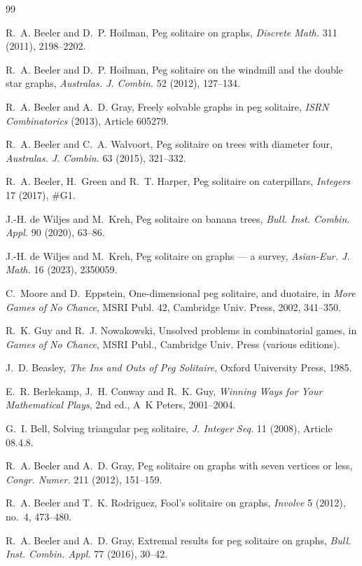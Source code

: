 \documentclass[11pt]{article}
\theoremstyle{definition}
\begin{document}
\begin{thebibliography}{99}

 R.~A. Beeler and D.~P. Hoilman, Peg solitaire on
graphs, \emph{Discrete Math.} 311 (2011), 2198--2202.

 R.~A. Beeler and D.~P. Hoilman, Peg solitaire on the
windmill and the double star graphs, \emph{Australas. J. Combin.} 52
(2012), 127--134.

 R.~A. Beeler and A.~D. Gray, Freely solvable graphs in
peg solitaire, \emph{ISRN Combinatorics} (2013), Article 605279.

 R.~A. Beeler and C.~A. Walvoort, Peg solitaire on
trees with diameter four, \emph{Australas. J. Combin.} 63 (2015),
321--332.

 R.~A. Beeler, H.~Green and R.~T. Harper, Peg
solitaire on caterpillars, \emph{Integers} 17 (2017), \#G1.

 J.-H. de Wiljes and M.~Kreh, Peg solitaire on banana
trees, \emph{Bull. Inst. Combin. Appl.} 90 (2020), 63--86.

 J.-H. de Wiljes and M.~Kreh, Peg solitaire on graphs
--- a survey, \emph{Asian-Eur. J. Math.} 16 (2023), 2350059.

 C.~Moore and D.~Eppstein, One-dimensional peg solitaire,
and duotaire, in \emph{More Games of No Chance}, MSRI Publ. 42,
Cambridge Univ. Press, 2002, 341--350.

 R.~K. Guy and R.~J. Nowakowski, Unsolved
problems in combinatorial games, in \emph{Games of No Chance}, MSRI
Publ., Cambridge Univ. Press (various editions).

 J.~D. Beasley, \emph{The Ins and Outs of Peg
Solitaire}, Oxford University Press, 1985.

 E.~R. Berlekamp, J.~H. Conway and R.~K. Guy,
\emph{Winning Ways for Your Mathematical Plays}, 2nd ed., A~K Peters,
2001--2004.

 G.~I. Bell, Solving triangular peg solitaire,
\emph{J. Integer Seq.} 11 (2008), Article 08.4.8.

 R.~A. Beeler and A.~D. Gray, Peg solitaire on graphs
with seven vertices or less, \emph{Congr. Numer.} 211 (2012),
151--159.

 R.~A. Beeler and T.~K. Rodriguez, Fool's solitaire on
graphs, \emph{Involve} 5 (2012), no.~4, 473--480.

 R.~A. Beeler and A.~D. Gray, Extremal results for peg
solitaire on graphs, \emph{Bull. Inst. Combin. Appl.} 77 (2016),
30--42.


\end{thebibliography}
\end{document}
